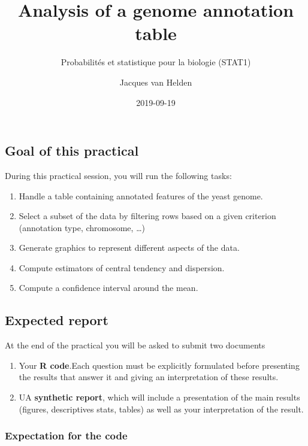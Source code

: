 \documentclass[]{article}
\title{Analysis of a genome annotation table}
\subtitle{Probabilités et statistique pour la biologie (STAT1)}
\author{Jacques van Helden}
\date{2019-09-19}
\providecommand{\tightlist}{%
  \setlength{\itemsep}{0pt}\setlength{\parskip}{0pt}}
\begin{document}
\maketitle

{
\setcounter{tocdepth}{3}
\tableofcontents
}
\subsection{Goal of this practical}\label{goal-of-this-practical}

During this practical session, you will run the following tasks:

\begin{enumerate}
\def\labelenumi{\arabic{enumi}.}
\tightlist
\item
  Handle a table containing annotated features of the yeast genome.
\item
  Select a subset of the data by filtering rows based on a given
  criterion (annotation type, chromosome, \ldots{})
\item
  Generate graphics to represent different aspects of the data.
\item
  Compute estimators of central tendency and dispersion.
\item
  Compute a confidence interval around the mean.
\end{enumerate}

\subsection{Expected report}\label{expected-report}

At the end of the practical you will be asked to submit two documents

\begin{enumerate}
\def\labelenumi{\arabic{enumi}.}
\tightlist
\item
  Your \textbf{R code}.Each question must be explicitly formulated
  before presenting the results that answer it and giving an
  interpretation of these results.
\item
  UA \textbf{synthetic report}, which will include a presentation of the
  main results (figures, descriptives stats, tables) as well as your
  interpretation of the result.
\end{enumerate}

\subsubsection{Expectation for the code}\label{expectation-for-the-code}
\end{document}
